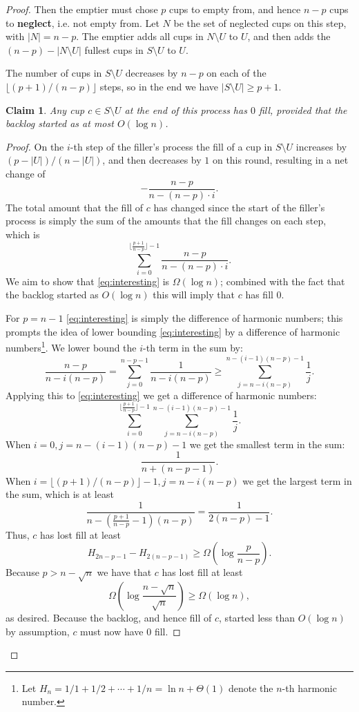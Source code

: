 \documentclass[twocolumn,11pt]{article}
\newtheorem{clm}{Claim}
\begin{document}
\begin{proof}
Then the emptier must chose $p$ cups to empty from, and hence
$n-p$ cups to \textbf{neglect}, i.e. not empty from. Let $N$ be
the set of neglected cups on this step, with $|N| = n-p$. The
emptier adds all cups in $N \setminus U$ to $U$, and then
adds the $(n-p) - |N\setminus U |$ fullest cups in $S
\setminus U$ to $U$. 

The number of cups in $S\setminus U$ decreases by $n-p$ on each
of the $\lfloor (p+1) / (n-p) \rfloor$ steps, so in the end we
have $|S\setminus U| \ge p+1$.

\begin{clm}
  Any cup $c \in S\setminus U$ at the end of this process has $0$
  fill, provided that the backlog started as at most $O(\log n)$.
\end{clm}
\begin{proof}
On the $i$-th step of the filler's process the fill of a
cup in $S \setminus U$ increases by $(p-|U|)/(n-|U|)$, and then
decreases by $1$ on this round, resulting in a net change of
$$-\frac{n-p}{n-(n-p)\cdot i}.$$
The total amount that the fill of $c$ has changed since
the start of the filler's process is simply the sum of the
amounts that the fill changes on each step, which is
\begin{equation}
  \label{eq:interesting}
\sum_{i=0}^{\big\lfloor \frac{p+1}{n-p}\big\rfloor - 1} \frac{n-p}{n-(n-p)\cdot i}.
\end{equation}
We aim to show that \eqref{eq:interesting} is $\Omega(\log n)$; combined
with the fact that the backlog started as $O(\log n)$ this will
imply that $c$ has fill $0$.

For $p=n-1$ \eqref{eq:interesting} is simply the difference of
harmonic numbers; this prompts the idea of lower bounding
\eqref{eq:interesting} by a difference of harmonic
numbers\footnote{ Let $H_n = 1/1+1/2+\cdots +1/n = \ln n +
\Theta(1)$ denote the $n$-th harmonic number.}.
We lower bound the $i$-th term in the sum by:
$$\frac{n-p}{n-i(n-p)} = \sum_{j=0}^{n-p-1} \frac{1}{n-i(n-p)} \ge \sum_{j=n-i(n-p)}^{n-(i-1)(n-p)-1}\frac{1}{j}.$$
Applying this to \eqref{eq:interesting} we get a difference of
harmonic numbers:
$${\sum_{i=0}^{\big\lfloor\frac{p+1}{n-p}\big\rfloor -
1}}\sum_{j=n-i(n-p)}^{n-(i-1)(n-p)-1} \frac{1}{j}.$$
When $i=0,
j=n-(i-1)(n-p)-1$ we get the smallest term in the sum:
$$\frac{1}{n+(n-p-1)}.$$ 
When $i = \lfloor(p+1) / (n-p)\rfloor - 1, j=n-i(n-p)$ we get the largest
term in the sum, which is at least 
$$\frac{1}{n - \left(\frac{p+1}{n-p} -1\right) (n-p)} =
\frac{1}{2(n-p)-1}.$$
Thus, $c$ has lost fill at least 
$$H_{2n-p-1} - H_{2(n-p-1)} \ge \Omega\left(\log \frac{p}{n-p}\right).$$
Because $p > n-\sqrt{n}$ we have that $c$ has lost fill at least
$$\Omega\left(\log \frac{n-\sqrt{n}}{\sqrt{n}}\right) \ge
\Omega(\log n),$$
as desired. Because the backlog, and hence fill of $c$, started
less than $O(\log n)$ by assumption, $c$ must
now have $0$ fill.
\end{proof}


\end{proof}
\end{document}
